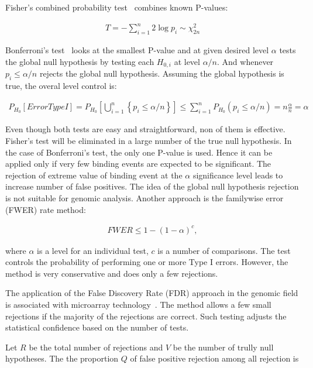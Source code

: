 Fisher's combined probability test~\cite{fisher1992statistical} combines known P-values:

\begin{align*}
    T = - \displaystyle \sum_{i=1}^{n} 2 \log p_i \sim  \chi_{2n}^{2}
\end{align*}

Bonferroni's test~\cite{hommel1988stagewise} looks at the smallest P-value and at given desired level $\alpha$ tests the global null hypothesis by testing each $H_{0,i}$ at level $\alpha /n$. 
And whenever $p_i \leq \alpha / n$ rejects the global null hypothesis.
Assuming the global hypothesis is true, the overal level control is: 

\begin{align*}
    P_{H_0}[Error Type I] = P_{H_0} \left[\bigcup_{i=1}^{n} \left\{ p_i \leq \alpha / n\right\}\right] \leq \sum_{i=1}^{n} P_{H_0}(p_i \le \alpha / n)  = n \frac{\alpha}{n} = \alpha
\end{align*}

Even though both tests are easy and straightforward, non of them is effective. 
Fisher's test will be eliminated in a large number of the true null hypothesis. 
In the case of  Bonferroni's test, the only one P-value is used. 
Hence it can be applied only if very few binding events are expected to be significant. 
The rejection of extreme value of binding event at the $\alpha$ significance level leads to increase number of false positives. 
The idea of the global null hypothesis rejection is not suitable for genomic analysis. 
Another approach is the familywise error (FWER) rate method:

\begin{align*}
    FWER \leq 1 - (1 - \alpha)^c, 
\end{align*}

where $\alpha$ is a level for an individual test, $c$ is a number of comparisons.
The test controls the probability of performing one or more Type I errors. 
However, the method is very conservative and does only a few rejections. 

The application of the False Discovery Rate (FDR) approach in the genomic field is associated with microarray technology~\cite{lai2017statistical}.
The method allows a few small rejections if the majority of the rejections are correct. 
Such testing adjusts the statistical confidence based on the number of tests. 

Let $R$ be the total number of rejections and $V$ be the number of trully null hypotheses.
The the proportion $Q$ of false positive rejection among all rejection is 

